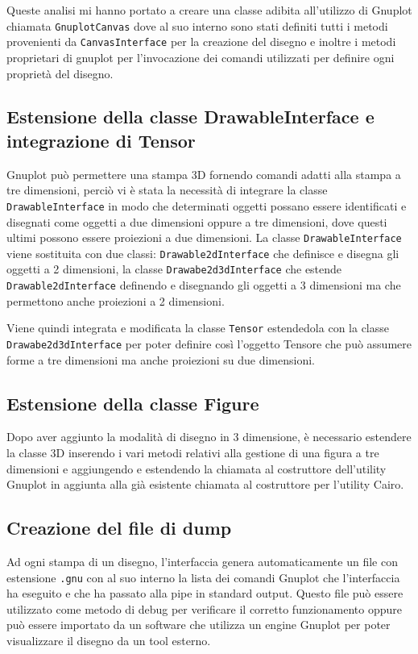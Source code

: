 \documentclass{article}
\begin{document}
Queste analisi mi hanno portato a creare una classe adibita all'utilizzo di Gnuplot chiamata \verb|GnuplotCanvas| dove al suo interno sono stati definiti tutti i metodi provenienti da \verb|CanvasInterface| per la creazione del disegno e inoltre i metodi proprietari di gnuplot per l'invocazione dei comandi utilizzati per definire ogni proprietà del disegno.

\subsection{Estensione della classe DrawableInterface e integrazione di Tensor}
Gnuplot può permettere una stampa 3D fornendo comandi adatti alla stampa a tre dimensioni, perciò vi è stata la necessità di integrare la classe \verb|DrawableInterface| in modo che determinati oggetti possano essere identificati e disegnati come oggetti a due dimensioni oppure a tre dimensioni, dove questi ultimi possono essere proiezioni a due dimensioni. La classe \verb|DrawableInterface| viene sostituita con due classi: \verb|Drawable2dInterface| che definisce e disegna gli oggetti a 2 dimensioni, la classe \verb|Drawabe2d3dInterface| che estende \verb|Drawable2dInterface| definendo e disegnando gli oggetti a 3 dimensioni ma che permettono anche proiezioni a 2 dimensioni.

Viene quindi integrata e modificata la classe \verb|Tensor| estendedola con la classe \verb|Drawabe2d3dInterface| per poter definire così l'oggetto Tensore che può assumere forme a tre dimensioni ma anche proiezioni su due dimensioni.

\subsection{Estensione della classe Figure}
Dopo aver aggiunto la modalità di disegno in 3 dimensione, è necessario estendere la classe 3D inserendo i vari metodi relativi alla gestione di una figura a tre dimensioni e aggiungendo e estendendo la chiamata al costruttore dell'utility Gnuplot in aggiunta alla già esistente chiamata al costruttore per l'utility Cairo.

\subsection{Creazione del file di dump}
Ad ogni stampa di un disegno, l'interfaccia genera automaticamente un file con estensione \verb|.gnu| con al suo interno la lista dei comandi Gnuplot che l'interfaccia ha eseguito e che ha passato alla pipe in standard output. Questo file può essere utilizzato come metodo di debug per verificare il corretto funzionamento oppure può essere importato da un software che utilizza un engine Gnuplot per poter visualizzare il disegno da un tool esterno.
\end{document}
